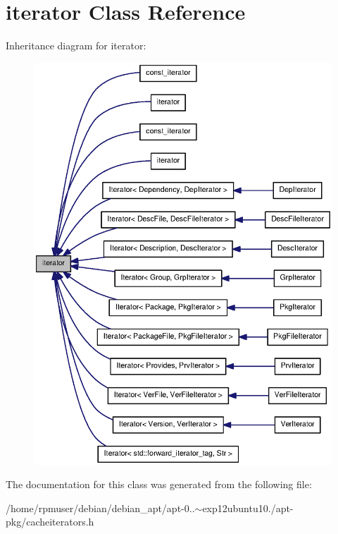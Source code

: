 \section{iterator \-Class \-Reference}
\label{classstd_1_1iterator}


\-Inheritance diagram for iterator\-:
\nopagebreak
\begin{figure}[H]
\begin{center}
\leavevmode
\includegraphics[width=350pt]{classstd_1_1iterator__inherit__graph}
\end{center}
\end{figure}


\-The documentation for this class was generated from the following file\-:\begin{DoxyCompactItemize}
\item 
/home/rpmuser/debian/debian\-\_\-apt/apt-\/0..$\sim$exp12ubuntu10./apt-\/pkg/cacheiterators.\-h\end{DoxyCompactItemize}
